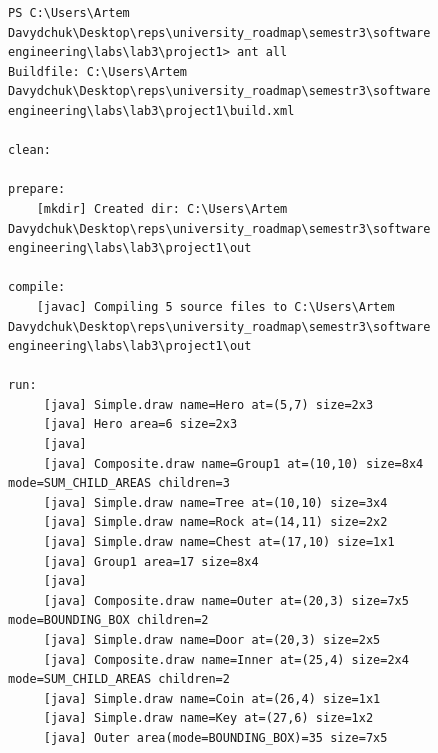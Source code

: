\documentclass[12pt,a4paper]{article}
\begin{document}
    \begin{verbatim}
PS C:\Users\Artem Davydchuk\Desktop\reps\university_roadmap\semestr3\software engineering\labs\lab3\project1> ant all
Buildfile: C:\Users\Artem Davydchuk\Desktop\reps\university_roadmap\semestr3\software engineering\labs\lab3\project1\build.xml

clean:

prepare:
    [mkdir] Created dir: C:\Users\Artem Davydchuk\Desktop\reps\university_roadmap\semestr3\software engineering\labs\lab3\project1\out

compile:
    [javac] Compiling 5 source files to C:\Users\Artem Davydchuk\Desktop\reps\university_roadmap\semestr3\software engineering\labs\lab3\project1\out

run:
     [java] Simple.draw name=Hero at=(5,7) size=2x3
     [java] Hero area=6 size=2x3
     [java]
     [java] Composite.draw name=Group1 at=(10,10) size=8x4 mode=SUM_CHILD_AREAS children=3
     [java] Simple.draw name=Tree at=(10,10) size=3x4
     [java] Simple.draw name=Rock at=(14,11) size=2x2
     [java] Simple.draw name=Chest at=(17,10) size=1x1
     [java] Group1 area=17 size=8x4
     [java]
     [java] Composite.draw name=Outer at=(20,3) size=7x5 mode=BOUNDING_BOX children=2
     [java] Simple.draw name=Door at=(20,3) size=2x5
     [java] Composite.draw name=Inner at=(25,4) size=2x4 mode=SUM_CHILD_AREAS children=2
     [java] Simple.draw name=Coin at=(26,4) size=1x1
     [java] Simple.draw name=Key at=(27,6) size=1x2
     [java] Outer area(mode=BOUNDING_BOX)=35 size=7x5


\end{verbatim}
\end{document}
